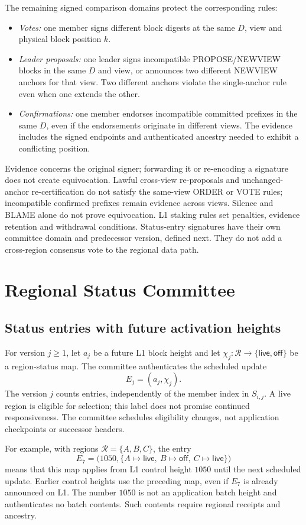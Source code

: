 \documentclass[11pt,a4paper,onecolumn]{article}
\newcommand{\Tag}[1]{\ensuremath{\mathsf{#1}}}
\begin{document}
The remaining signed comparison domains protect the corresponding rules:
\begin{itemize}
\item \emph{Votes:} one member signs different block digests at the same
$D$, view and physical block position $k$.
\item \emph{Leader proposals:} one leader signs incompatible
PROPOSE/NEWVIEW blocks in the same $D$ and view, or announces two different
NEWVIEW anchors for that view. Two different anchors violate the single-anchor
rule even when one extends the other.
\item \emph{Confirmations:} one member endorses incompatible committed
prefixes in the same $D$, even if the endorsements originate in different
views. The evidence includes the signed endpoints and authenticated ancestry
needed to exhibit a conflicting position.
\end{itemize}
Evidence concerns the original signer; forwarding it or re-encoding a
signature does not create equivocation. Lawful cross-view re-proposals and
unchanged-anchor re-certification do not satisfy the same-view ORDER or VOTE
rules; incompatible confirmed prefixes remain evidence across views.
Silence and BLAME alone do not prove equivocation. L1 staking rules set
penalties, evidence retention and withdrawal conditions.
Status-entry signatures have their own committee domain and predecessor
version, defined next. They do not add a cross-region consensus vote to
the regional data path.


\section{Regional Status Committee}\label{sec:committee}
\subsection{Status entries with future activation heights}
For version $j\geq1$, let $a_j$ be a future L1 block height and let
$\chi_j:\mathcal R\to\{\Tag{live},\Tag{off}\}$ be a region-status map.
The committee authenticates the scheduled update
\[
 E_j=(a_j,\chi_j).
\]
The version $j$ counts entries, independently of the member index in
$S_{i,j}$. A live region is eligible for selection; this label does not
promise continued responsiveness. The committee schedules eligibility
changes, not application checkpoints or successor headers.

For example, with regions $\mathcal R=\{A,B,C\}$, the entry
\[
 E_7=\bigl(1050,\{A\mapsto\Tag{live},\ B\mapsto\Tag{off},
 \ C\mapsto\Tag{live}\}\bigr)
\]
means that this map applies from L1 control height $1050$ until the next
scheduled update. Earlier control heights use the preceding map, even if
$E_7$ is already announced on L1. The number $1050$ is not an application
batch height and authenticates no batch contents. Such contents require
regional receipts and ancestry.
\end{document}
